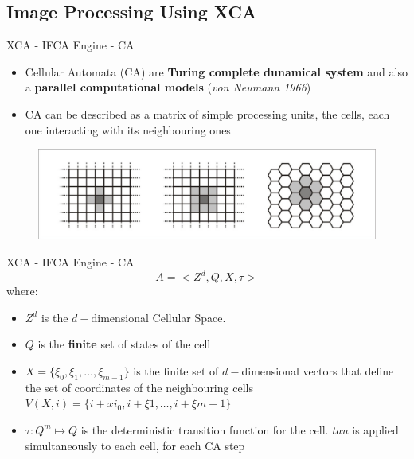 \documentclass{beamer}
\begin{document}
	\subsection{Image Processing Using XCA}
		\begin{frame}{XCA - IFCA Engine - CA}
			\begin{itemize}
			\item Cellular Automata (CA) are \textbf{Turing complete dunamical system} and also a \textbf{parallel computational models} (\textit{von Neumann 1966})
			\item CA can be described as a matrix of simple processing units, the cells, each one interacting with its neighbouring ones

			\end{itemize}
					\begin{figure}
					\centering
					\includegraphics[scale=0.68]{./images/CA}
				\end{figure}
		\end{frame}
		\begin{frame}{XCA - IFCA Engine - CA}
		\[
			A = \Big<Z^d , Q, X, \tau \Big>		
		\] where:
		\begin{itemize}
		 \item $Z^d$ is the $d-$dimensional Cellular Space.
		 \item $Q$ is the \textbf{finite} set of states of the cell
		 \item $X = \{\xi_0, \xi_1, \ldots , \xi_{m-1}\}$ is the finite set of $d-$dimensional vectors that define the set of coordinates of the neighbouring cells $V(X,i)=\{i+xi_0, i+\xi{1},\ldots, i+\xi{m-1}\}$

		 \item $\tau: Q^m \mapsto  Q$ is the deterministic transition function for the cell. $tau$ is applied simultaneously to each cell, for each CA step
		\end{itemize}
		\end{frame}
		
\end{document}
